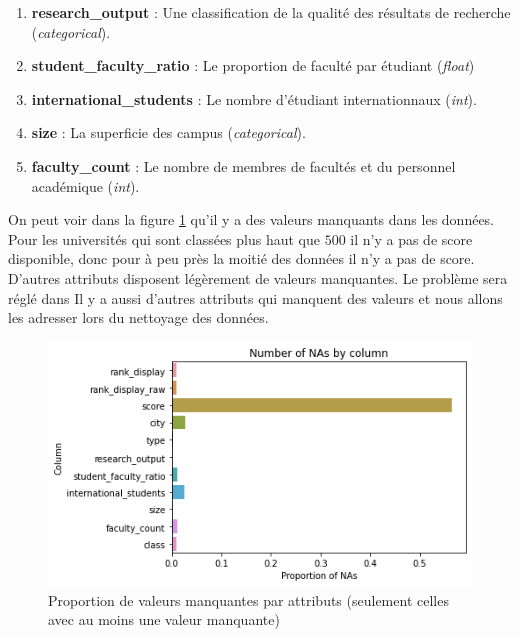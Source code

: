 \documentclass[twocolumns]{udes_rapport}
\begin{document}
\begin{enumerate}
        \item \textbf{research\_output} : Une classification de la qualité des résultats de recherche (\emph{categorical}).
        
        \item \textbf{student\_faculty\_ratio} : Le proportion de faculté par étudiant (\emph{float})
        
        \item \textbf{international\_students} : Le nombre d’étudiant internationnaux (\emph{int}).
        
        \item \textbf{size} : La superficie des campus (\emph{categorical}).
        
        \item \textbf{faculty\_count} : Le nombre de membres de facultés et du personnel académique (\emph{int}).
    \end{enumerate}

    On peut voir dans la figure \ref{fig:mis_vals} qu'il y a des valeurs manquants dans les données. Pour les universités qui sont classées plus haut que $500$ il n'y a pas de score disponible, donc pour à peu près la moitié des données il n'y a pas de score. D'autres attributs disposent légèrement de valeurs manquantes. Le problème sera réglé dans 
    Il y a aussi d'autres attributs qui manquent des valeurs et nous allons les adresser lors du nettoyage des données.
    
    \begin{figure}[h!]
        \centering
        \includegraphics[scale=0.5]{Images/na_proportion_2.png}
        \caption{Proportion de valeurs manquantes par attributs (seulement celles avec au moins une valeur manquante)}
        \label{fig:mis_vals}
    \end{figure}
\end{document}
